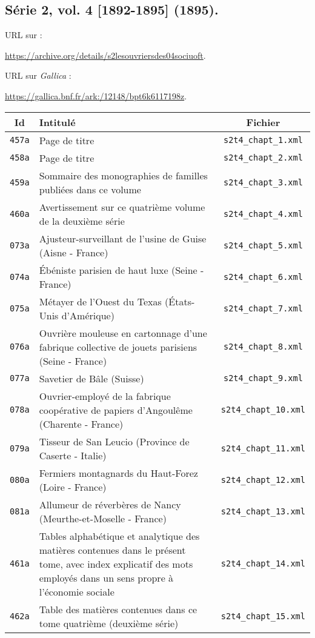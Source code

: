 \subsection{Série 2, vol. 4 [1892-1895] (1895).}
\label{mappings2t4}

URL sur \ia{} : 

\url{https://archive.org/details/s2lesouvriersdes04sociuoft}.

URL sur \textit{Gallica} : 

\url{https://gallica.bnf.fr/ark:/12148/bpt6k6117198z}.

\begin{center}
\begin{longtable}{ | c | p{9.5cm} | c | }
\hline
Id & Intitulé & Fichier \\ \hline
\texttt{457a} & Page de titre & \texttt{s2t4\_chapt\_1.xml} \\ \hline
\texttt{458a} & Page de titre & \texttt{s2t4\_chapt\_2.xml} \\ \hline
\texttt{459a} & Sommaire des monographies de familles publiées dans ce volume & \texttt{s2t4\_chapt\_3.xml} \\ \hline
\texttt{460a} & Avertissement sur ce quatrième volume de la deuxième série & \texttt{s2t4\_chapt\_4.xml} \\ \hline
\texttt{073a} & Ajusteur-surveillant de l'usine de Guise (Aisne - France) & \texttt{s2t4\_chapt\_5.xml} \\ \hline
\texttt{074a} & Ébéniste parisien de haut luxe (Seine - France) & \texttt{s2t4\_chapt\_6.xml} \\ \hline
\texttt{075a} & Métayer de l'Ouest du Texas (États-Unis d'Amérique) & \texttt{s2t4\_chapt\_7.xml} \\ \hline
\texttt{076a} & Ouvrière mouleuse en cartonnage d'une fabrique collective de jouets parisiens (Seine - France) & \texttt{s2t4\_chapt\_8.xml} \\ \hline
\texttt{077a} & Savetier de Bâle (Suisse) & \texttt{s2t4\_chapt\_9.xml} \\ \hline
\texttt{078a} & Ouvrier-employé de la fabrique coopérative de papiers d'Angoulême (Charente - France) & \texttt{s2t4\_chapt\_10.xml} \\ \hline
\texttt{079a} & Tisseur de San Leucio (Province de Caserte - Italie) & \texttt{s2t4\_chapt\_11.xml} \\ \hline
\texttt{080a} & Fermiers montagnards du Haut-Forez (Loire - France) & \texttt{s2t4\_chapt\_12.xml} \\ \hline
\texttt{081a} & Allumeur de réverbères de Nancy (Meurthe-et-Moselle - France) & \texttt{s2t4\_chapt\_13.xml} \\ \hline
\texttt{461a} & Tables alphabétique et analytique des matières contenues dans le présent tome, avec index explicatif des mots employés dans un sens propre à l'économie sociale & \texttt{s2t4\_chapt\_14.xml} \\ \hline
\texttt{462a} & Table des matières contenues dans ce tome quatrième (deuxième série) & \texttt{s2t4\_chapt\_15.xml} \\ \hline
\end{longtable}
\end{center}

